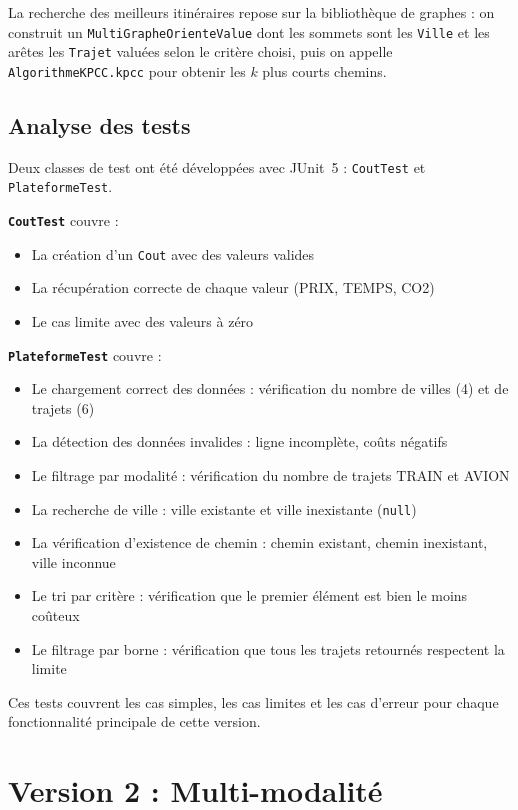 \documentclass[fontsize=10pt,oneside,parskip=half]{scrreprt}
\newcommand{\ic}[1]{{\setlength{\fboxsep}{2pt}\colorbox{BeigeSerein}{\texttt{#1}}}}
\begin{document}
La recherche des meilleurs itinéraires repose sur la bibliothèque de graphes : on
construit un \ic{MultiGrapheOrienteValue} dont les sommets sont les \ic{Ville} et
les arêtes les \ic{Trajet} valuées selon le critère choisi, puis on appelle
\ic{AlgorithmeKPCC.kpcc} pour obtenir les $k$ plus courts chemins.

\section{Analyse des tests}

Deux classes de test ont été développées avec JUnit~5 : \ic{CoutTest} et
\ic{PlateformeTest}.

\noindent\textbf{\ic{CoutTest}} couvre :
\begin{itemize}
  \item La création d'un \ic{Cout} avec des valeurs valides
  \item La récupération correcte de chaque valeur (PRIX, TEMPS, CO2)
  \item Le cas limite avec des valeurs à zéro
\end{itemize}

\noindent\textbf{\ic{PlateformeTest}} couvre :
\begin{itemize}
  \item Le chargement correct des données : vérification du nombre de villes (4) et de trajets (6)
  \item La détection des données invalides : ligne incomplète, coûts négatifs
  \item Le filtrage par modalité : vérification du nombre de trajets TRAIN et AVION
  \item La recherche de ville : ville existante et ville inexistante (\ic{null})
  \item La vérification d'existence de chemin : chemin existant, chemin inexistant, ville inconnue
  \item Le tri par critère : vérification que le premier élément est bien le moins coûteux
  \item Le filtrage par borne : vérification que tous les trajets retournés respectent la limite
\end{itemize}

Ces tests couvrent les cas simples, les cas limites et les cas d'erreur pour chaque
fonctionnalité principale de cette version.

\chapter{Version 2 : Multi-modalité}
\end{document}
